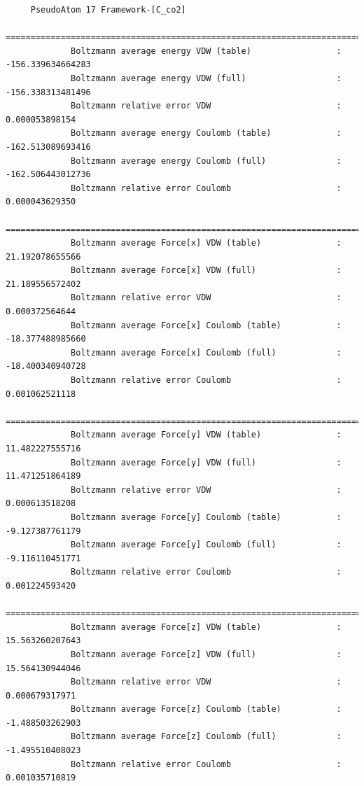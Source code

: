 \begin{tiny}
\begin{verbatim}
     PseudoAtom 17 Framework-[C_co2]
     =========================================================================================
             Boltzmann average energy VDW (table)                 :  -156.339634664283
             Boltzmann average energy VDW (full)                  :  -156.338313481496
             Boltzmann relative error VDW                         :     0.000053898154
             Boltzmann average energy Coulomb (table)             :  -162.513089693416
             Boltzmann average energy Coulomb (full)              :  -162.506443012736
             Boltzmann relative error Coulomb                     :     0.000043629350
     =========================================================================================
             Boltzmann average Force[x] VDW (table)               :    21.192078655566
             Boltzmann average Force[x] VDW (full)                :    21.189556572402
             Boltzmann relative error VDW                         :     0.000372564644
             Boltzmann average Force[x] Coulomb (table)           :   -18.377488985660
             Boltzmann average Force[x] Coulomb (full)            :   -18.400340940728
             Boltzmann relative error Coulomb                     :     0.001062521118
     =========================================================================================
             Boltzmann average Force[y] VDW (table)               :    11.482227555716
             Boltzmann average Force[y] VDW (full)                :    11.471251864189
             Boltzmann relative error VDW                         :     0.000613518208
             Boltzmann average Force[y] Coulomb (table)           :    -9.127387761179
             Boltzmann average Force[y] Coulomb (full)            :    -9.116110451771
             Boltzmann relative error Coulomb                     :     0.001224593420
     =========================================================================================
             Boltzmann average Force[z] VDW (table)               :    15.563260207643
             Boltzmann average Force[z] VDW (full)                :    15.564130944046
             Boltzmann relative error VDW                         :     0.000679317971
             Boltzmann average Force[z] Coulomb (table)           :    -1.488503262903
             Boltzmann average Force[z] Coulomb (full)            :    -1.495510408023
             Boltzmann relative error Coulomb                     :     0.001035710819



\end{verbatim}
\end{tiny}
